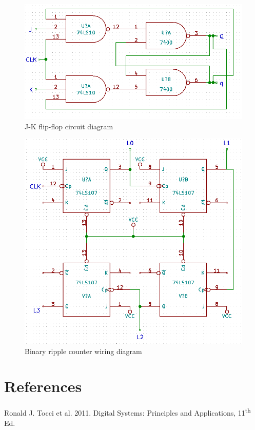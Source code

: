 \documentclass[11pt,a4paper]{article}
\begin{document}
\begin{figure}[H]
    \centering
    \includegraphics[width=5in]{JK-flipflop.png}
    \caption{J-K flip-flop circuit diagram}
\end{figure}
\begin{figure}[H]
    \centering
    \includegraphics[width=5in]{ripple.png}
    \caption{Binary ripple counter wiring diagram}
\end{figure}
\section{References}
Ronald J. Tocci et al. 2011. Digital Systems: Principles and Applications, 11\textsuperscript{th} Ed.
\end{document}
